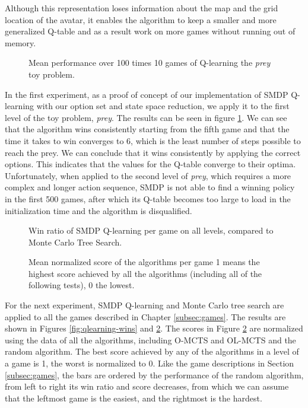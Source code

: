 Although this representation loses information about the map and the grid
location of the avatar, it enables the algorithm to keep a smaller and more
generalized Q-table and as a result work on more games without running out of
memory.

\begin{figure}
	\centering
	\caption{Mean performance over 100 times 10 games of Q-learning the
	\textit{prey} toy problem.}
	\label{fig:qlearning}
\end{figure}

In the first experiment, as a proof of concept of our implementation of SMDP
Q-learning with our option set and state space reduction, we apply it to the
first level of the toy problem, \textit{prey}. The results can be seen in figure
\ref{fig:qlearning}. We can see that the algorithm wins consistently starting
from the fifth game and that the time it takes to win converges to 6, which is
the least number of steps possible to reach the prey.  We can conclude that it
wins consistently by applying the correct options. This indicates that the
values for the Q-table converge to their optima. Unfortunately, when applied to
the second level of \textit{prey}, which requires a more complex and longer
action sequence, SMDP is not able to find a winning policy in the first 500
games, after which its Q-table becomes too large to load in the initialization
time and the algorithm is disqualified.

\begin{figure}
	\centering
	\vspace{-.8cm}
	\caption{Win ratio of SMDP Q-learning per game on all levels, compared to Monte Carlo Tree Search.}
	\label{fig:qlearning-wins}
	\centering
	\vspace{-.8cm}
	\caption{Mean normalized score of the algorithms per game 1 means the
	highest score achieved by all the algorithms (including all of the following
tests), 0 the lowest.}
	\label{fig:qlearning-scores}
\end{figure}

For the next experiment, SMDP Q-learning and Monte Carlo tree search are applied
to all the games described in Chapter \ref{subsec:games}. The results are shown
in Figures \ref{fig:qlearning-wins} and \ref{fig:qlearning-scores}. The scores
in Figure \ref{fig:qlearning-scores} are normalized using the data of all the
algorithms, including O-MCTS and OL-MCTS and the random algorithm. The best
score achieved by any of the algorithms in a level of a game is 1, the worst is
normalized to 0. Like the game descriptions in Section \ref{subsec:games}, the
bars are ordered by the performance of the random algorithm, from left to right
its win ratio and score decreases, from which we can assume that the leftmost
game is the easiest, and the rightmost is the hardest.

